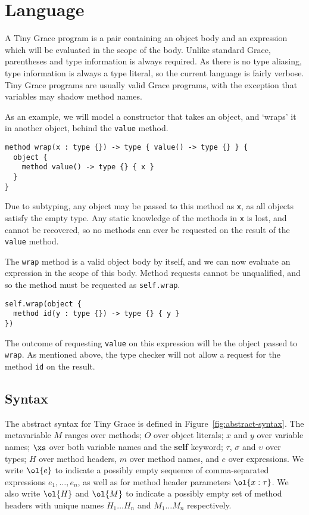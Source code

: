 \section{Language}\label{sec:language}

A Tiny Grace program is a pair containing an object body and an expression which
will be evaluated in the scope of the body. Unlike standard Grace, parentheses
and type information is always required. As there is no type aliasing, type
information is always a type literal, so the current language is fairly verbose.
Tiny Grace programs are usually valid Grace programs, with the exception that
variables may shadow method names.

As an example, we will model a constructor that takes an object, and `wraps' it
in another object, behind the \lstinline{value} method.

\begin{lstlisting}
method wrap(x : type {}) -> type { value() -> type {} } {
  object {
    method value() -> type {} { x }
  }
}
\end{lstlisting}

\noindent Due to subtyping, any object may be passed to this method as
\lstinline{x}, as all objects satisfy the empty type. Any static knowledge of
the methods in \lstinline{x} is lost, and cannot be recovered, so no methods can
ever be requested on the result of the \lstinline{value} method.

The \lstinline{wrap} method is a valid object body by itself, and we can now
evaluate an expression in the scope of this body. Method requests cannot be
unqualified, and so the method must be requested as \lstinline{self.wrap}.

\begin{lstlisting}
self.wrap(object {
  method id(y : type {}) -> type {} { y }
})
\end{lstlisting}

\noindent The outcome of requesting \lstinline{value} on this expression will be
the object passed to \lstinline{wrap}. As mentioned above, the type checker will
not allow a request for the method \lstinline{id} on the result.

\subsection{Syntax}\label{sec:syntax}

The abstract syntax for Tiny Grace is defined in
Figure~\ref{fig:abstract-syntax}. The metavariable $M$ ranges over methods;
$O$ over object literals; $x$ and $y$ over variable names; $\xs$ over both
variable names and the {\sffamily\bfseries self} keyword; $\tau$, $\sigma$ and
$\upsilon$ over types; $H$ over method headers, $m$ over method names, and $e$
over expressions. We write $\ol{e}$ to indicate a possibly empty sequence of
comma-separated expressions $e_1, \dots, e_n$, as well as for method header
parameters $\ol{x : \tau}$. We also write $\ol{H}$ and $\ol{M}$ to indicate a
possibly empty set of method headers with unique names $H_1 \dots H_n$ and
$M_1 \dots M_n$ respectively.

